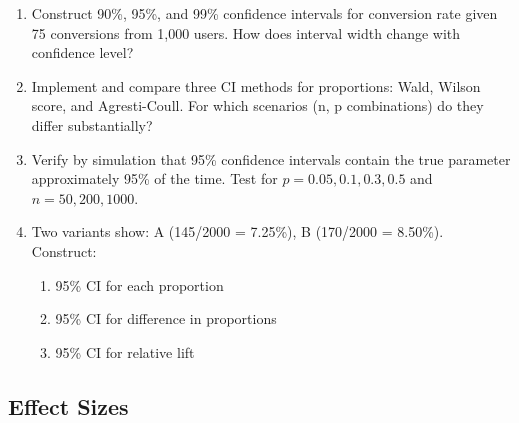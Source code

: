 \begin{enumerate}
    \item Construct 90\%, 95\%, and 99\% confidence intervals for conversion rate given 75 conversions from 1,000 users. How does interval width change with confidence level?

    \item Implement and compare three CI methods for proportions: Wald, Wilson score, and Agresti-Coull. For which scenarios (n, p combinations) do they differ substantially?

    \item Verify by simulation that 95\% confidence intervals contain the true parameter approximately 95\% of the time. Test for $p = 0.05, 0.1, 0.3, 0.5$ and $n = 50, 200, 1000$.

    \item Two variants show: A (145/2000 = 7.25\%), B (170/2000 = 8.50\%). Construct:
    \begin{enumerate}
        \item 95\% CI for each proportion
        \item 95\% CI for difference in proportions
        \item 95\% CI for relative lift
    \end{enumerate}
\end{enumerate}

\subsection{Effect Sizes}

